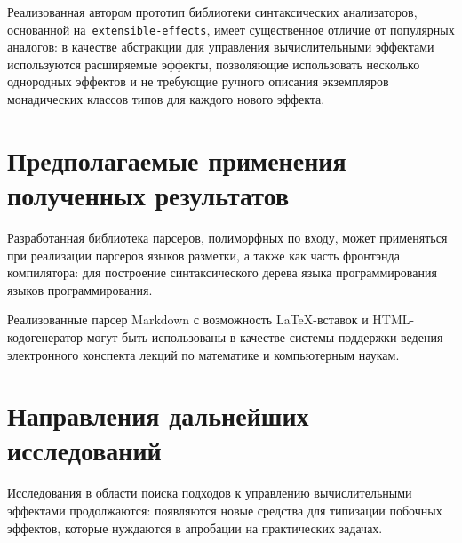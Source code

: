   Реализованная автором прототип библиотеки синтаксических анализаторов, 
  основанной на~\lstinline{extensible-effects}, имеет существенное отличие от популярных аналогов: в качестве абстракции для управления вычислительными эффектами используются расширяемые эффекты, 
  позволяющие использовать несколько однородных эффектов и не требующие ручного 
  описания экземпляров монадических классов типов для каждого нового эффекта.  


\section{Предполагаемые применения полученных результатов}

  Разработанная библиотека парсеров, полиморфных по входу, может применяться 
  при реализации парсеров языков разметки, а также как часть фронтэнда компилятора: 
  для построение синтаксического дерева языка программирования языков программирования. 

  Реализованные парсер Markdown с возможность \LaTeX-вставок и HTML-кодогенератор 
  могут быть использованы в качестве системы поддержки ведения электронного конспекта
  лекций по математике и компьютерным наукам. 

\section{Направления дальнейших исследований}

  Исследования в области поиска подходов к управлению вычислительными эффектами 
  продолжаются: появляются новые средства для типизации побочных эффектов, 
  которые нуждаются в апробации на практических задачах. 
